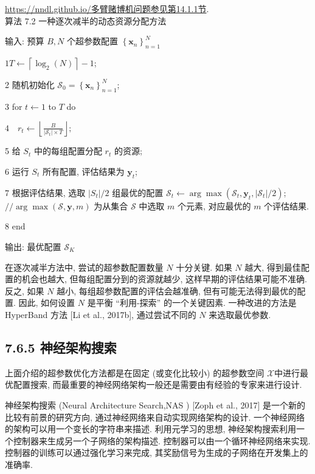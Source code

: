 \documentclass[10pt]{article}
\begin{document}
\href{https://nndl.github.io/%E5%A4%9A%E8%87%82%E8%B5%8C%E5%8D%9A%E6%9C%BA%E9%97%AE%E9%A2%98%E5%8F%82%E8%A7%81%E7%AC%AC14.1.1%E8%8A%82}{https://nndl.github.io/多臂赌博机问题参见第14.1.1节}.\\
算法 7.2 一种逐次减半的动态资源分配方法

输入: 预算 $B, N$ 个超参数配置 $\left\{\boldsymbol{x}_{n}\right\}_{n=1}^{N}$

$1 T \leftarrow\left\lceil\log _{2}(N)\right\rceil-1$;

2 随机初始化 $\mathcal{S}_{0}=\left\{\boldsymbol{x}_{n}\right\}_{n=1}^{N}$;

3 for $t \leftarrow 1$ to $T$ do

$4 \quad r_{t} \leftarrow\left\lfloor\frac{B}{\left|\mathcal{S}_{t}\right| \times T}\right\rfloor ;$

5 给 $S_{t}$ 中的每组配置分配 $r_{t}$ 的资源;

6 运行 $S_{t}$ 所有配置, 评估结果为 $\boldsymbol{y}_{t}$;

7 根据评估结果, 选取 $\left|S_{t}\right| / 2$ 组最优的配置 $\mathcal{S}_{t} \leftarrow \arg \max \left(\mathcal{S}_{t}, \boldsymbol{y}_{t},\left|\mathcal{S}_{t}\right| / 2\right)$; $/ / \arg \max (\mathcal{S}, \boldsymbol{y}, m)$ 为从集合 $\mathcal{S}$ 中选取 $m$ 个元素, 对应最优的 $m$ 个评估结果.

8 end

输出: 最优配置 $\mathcal{S}_{K}$

在逐次减半方法中, 尝试的超参数配置数量 $N$ 十分关键. 如果 $N$ 越大, 得到最佳配置的机会也越大, 但每组配置分到的资源就越少, 这样早期的评估结果可能不准确. 反之, 如果 $N$ 越小, 每组超参数配置的评估会越准确, 但有可能无法得到最优的配置. 因此, 如何设置 $N$ 是平衡 “利用-探索” 的一个关键因素. 一种改进的方法是 HyperBand 方法 [Li et al., 2017b], 通过尝试不同的 $N$ 来选取最优参数.

\subsection*{7.6.5 神经架构搜索}
上面介绍的超参数优化方法都是在固定 (或变化比较小) 的超参数空间 $\mathcal{X}$中进行最优配置搜索, 而最重要的神经网络架构一般还是需要由有经验的专家来进行设计.

神经架构搜索 (Neural Architecture Search,NAS ) [Zoph et al., 2017] 是一个新的比较有前景的研究方向, 通过神经网络来自动实现网络架构的设计. 一个神经网络的架构可以用一个变长的字符串来描述. 利用元学习的思想, 神经架构搜索利用一个控制器来生成另一个子网络的架构描述. 控制器可以由一个循环神经网络来实现. 控制器的训练可以通过强化学习来完成, 其奖励信号为生成的子网络在开发集上的准确率.
\end{document}
